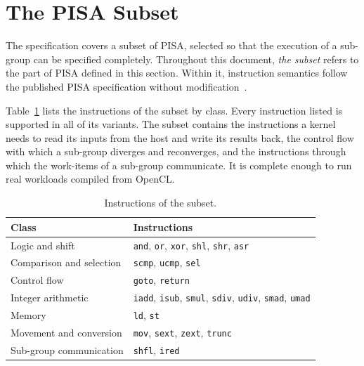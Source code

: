 \section{The PISA Subset}
\label{sec:pisa-subset}

The specification covers a subset of PISA, selected so that the execution
of a sub-group can be specified completely. Throughout this document,
\emph{the subset} refers to the part of PISA defined in this section.
Within it, instruction semantics follow the published PISA specification
without modification~\cite{pisa-spec}.

Table~\ref{tab:subset-instructions} lists the instructions of the subset
by class. Every
instruction listed is supported in all of its variants.
The subset contains the instructions a kernel needs to read its inputs
from the host and write its results back, the control flow with which a
sub-group diverges and reconverges, and the instructions through which
the work-items of a sub-group communicate. It is complete enough to run
real workloads compiled from OpenCL.

\begin{table}[t]
\centering
\begin{tabular}{ll}
\toprule
Class & Instructions \\
\midrule
Logic and shift          & \texttt{and}, \texttt{or}, \texttt{xor}, \texttt{shl}, \texttt{shr}, \texttt{asr} \\
Comparison and selection & \texttt{scmp}, \texttt{ucmp}, \texttt{sel} \\
Control flow             & \texttt{goto}, \texttt{return} \\
Integer arithmetic       & \texttt{iadd}, \texttt{isub}, \texttt{smul}, \texttt{sdiv}, \texttt{udiv}, \texttt{smad}, \texttt{umad} \\
Memory                   & \texttt{ld}, \texttt{st} \\
Movement and conversion  & \texttt{mov}, \texttt{sext}, \texttt{zext}, \texttt{trunc} \\
Sub-group communication  & \texttt{shfl}, \texttt{ired} \\
\bottomrule
\end{tabular}
\caption{Instructions of the subset.}
\label{tab:subset-instructions}
\end{table}

